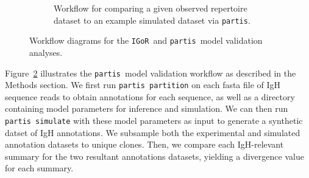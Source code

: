 \documentclass{article}
\newcommand{\partis}{\texttt{partis}}
\newcommand{\igor}{\texttt{IGoR}}
\begin{document}
\begin{figure}
\begin{subfigure}{0.5\textwidth}
\begin{adjustbox}{max totalsize={\textwidth}{.5\textheight},center}
    \end{adjustbox}
    \caption{Workflow for comparing a given observed repertoire dataset to an example simulated dataset via \partis.}
    \label{fig:PartisWorkflow}
    \end{subfigure}
    \caption{Workflow diagrams for the \igor\ and \partis\ model validation analyses.}
\end{figure}
Figure~\ref{fig:PartisWorkflow} illustrates the \partis\ model validation workflow as described in the Methods section.
We first run \texttt{partis partition} on each fasta file of IgH sequence reads to obtain annotations for each sequence, as well as a directory containing model parameters for inference and simulation.
We can then run \texttt{partis simulate} with these model parameters as input to generate a synthetic datset of IgH annotations.
We subsample both the experimental and simulated annotation datasets to unique clones.
Then, we compare each IgH-relevant summary for the two resultant annotations datasets, yielding a divergence value for each summary.
\end{document}
